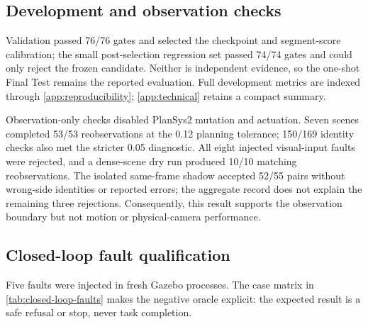 \subsection{Development and observation checks}

Validation passed 76/76 gates and selected the checkpoint and segment-score
calibration; the small post-selection regression set passed 74/74 gates and
could only reject the frozen candidate. Neither is independent evidence, so the
one-shot Final Test remains the reported evaluation. Full development metrics
are indexed through \cref{app:reproducibility}; \cref{app:technical} retains a
compact summary.

Observation-only checks disabled PlanSys2 mutation and actuation. Seven scenes
completed 53/53 reobservations at the 0.12 planning tolerance; 150/169 identity
checks also met the stricter 0.05 diagnostic. All eight injected visual-input
faults were rejected, and a dense-scene dry run produced 10/10 matching
reobservations. The isolated same-frame shadow accepted 52/55 pairs without
wrong-side identities or reported errors; the aggregate record does not explain
the remaining three rejections. Consequently, this result supports the
observation boundary but not motion or physical-camera performance.

\subsection{Closed-loop fault qualification}

Five faults were injected in fresh Gazebo processes. The case matrix in
\cref{tab:closed-loop-faults} makes the negative oracle explicit: the expected
result is a safe refusal or stop, never task completion.

